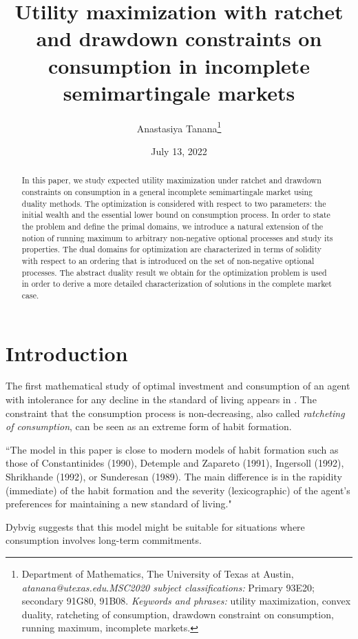 \documentclass[11pt, oneside]{article}   	%
\title{Utility maximization with ratchet and drawdown constraints on consumption in incomplete semimartingale markets}
\author{Anastasiya Tanana\thanks{Department of Mathematics, The University of Texas at Austin, \textit{atanana@utexas.edu}.\newline \textit{MSC2020 subject classifications:} Primary 93E20; secondary 91G80, 91B08. \newline \textit{Keywords and phrases:} utility maximization, convex duality, ratcheting of consumption, drawdown constraint on consumption, running maximum, incomplete markets.}}
\date{July 13, 2022}							%
\theoremstyle{plain}
\theoremstyle{definition}
\theoremstyle{remark}
\begin{document}
\maketitle


\begin{abstract}{\footnotesize
In this paper, we study expected utility maximization under ratchet and drawdown constraints on consumption in a general incomplete semimartingale market using duality methods. The optimization is considered with respect to two parameters: the initial wealth and the essential lower bound on consumption process. In order to state the problem and define the primal domains, we introduce a natural extension of the notion of running maximum to arbitrary non-negative optional processes and study its properties. The dual domains for optimization are characterized in terms of solidity with respect to an ordering that is introduced on the set of non-negative optional processes. The abstract duality result we obtain for the optimization problem is used in order to derive a more detailed characterization of solutions in the complete market case.}
\end{abstract}




\section{Introduction}\label{sec:intro}

The first mathematical study of optimal investment and consumption of an agent with intolerance for any decline in the standard of living appears in \cite{dybvig}. The constraint that the consumption process is non-decreasing, also called \textit{ratcheting of consumption}, can be seen as an extreme form of habit formation.

{\footnotesize
\begin{displayquote}
``The model in this paper is close to modern models of habit formation such as those of Constantinides (1990), Detemple and Zapareto (1991), Ingersoll (1992), Shrikhande (1992), or Sunderesan (1989). The main difference is in the rapidity (immediate) of the habit formation and the severity (lexicographic) of the agent's preferences for maintaining a new standard of living." \hfill \citet[p. 289]{dybvig}
\end{displayquote}}
Dybvig suggests that this model might be suitable for situations where consumption involves long-term commitments.
\end{document}
